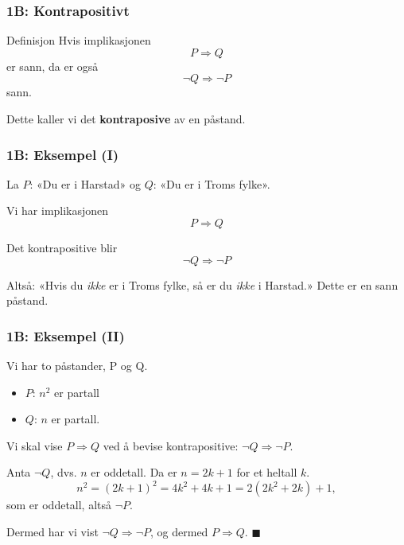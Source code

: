 \blueheader
\begin{frame}
\frametitle{1B: Kontrapositivt}

\begin{blue*}{Definisjon}
Hvis  implikasjonen
\[
P \Rightarrow Q
\]
er sann,  
da er også
\[
\lnot Q \Rightarrow \lnot P
\]
sann.

\medskip
Dette kaller vi det \textbf{kontraposive} av en påstand.
\end{blue*}

\end{frame}

\greenheader
\begin{frame}
\frametitle{1B: Eksempel (I) }


La $P$: «Du er i Harstad»  
og $Q$: «Du er i Troms fylke».

\medskip
Vi har implikasjonen
\[
P \Rightarrow Q
\]

Det kontrapositive blir
\[
\lnot Q \Rightarrow \lnot P
\]

\medskip
Altså: «Hvis du \emph{ikke} er i Troms fylke, så er du \emph{ikke} i Harstad.»  
Dette er en sann påstand.


\end{frame}
\greenheader
\begin{frame}
\frametitle{1B: Eksempel (II)}
Vi har to påstander, P og Q.
\begin{itemize}
    \item[] $P$: $n^2$ er partall\\
    \item[] $Q$: $n$ er partall.
\end{itemize}   

\medskip
Vi skal vise $P \Rightarrow Q$ ved å bevise kontrapositive: $\lnot Q \Rightarrow \lnot P$.

\medskip
Anta $\lnot Q$, dvs. $n$ er oddetall.  Da er $n=2k+1$ for et heltall $k$.  
\[
n^2 = (2k+1)^2 = 4k^2 + 4k + 1 = 2(2k^2+2k)+1,
\]
som er oddetall, altså $\lnot P$.

\medskip
Dermed har vi vist $\lnot Q \Rightarrow \lnot P$, og dermed $P \Rightarrow Q$. \hfill $\blacksquare$


\end{frame}

